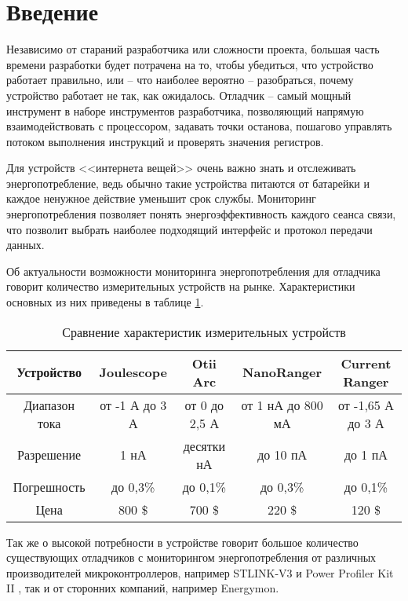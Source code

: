 
\chapter*{Введение}
\hspace{1cm} Независимо от стараний разработчика или сложности проекта, большая часть времени разработки
будет потрачена на то, чтобы убедиться, что устройство работает правильно, или -- что наиболее
вероятно -- разобраться, почему устройство работает не так, как ожидалось. Отладчик -- самый мощный 
инструмент в наборе инструментов разработчика, позволяющий напрямую взаимодействовать с процессором,
задавать точки останова, пошагово управлять потоком выполнения инструкций и проверять  значения
регистров. \cite{Lakamera:embed}

Для устройств <<интернета вещей>> очень важно знать и отслеживать энергопотребление,
ведь обычно такие устройства питаются от батарейки и каждое ненужное действие уменьшит
срок службы. Мониторинг энергопотребления позволяет понять энергоэффективность каждого сеанса связи,
что позволит выбрать наиболее подходящий интерфейс и протокол передачи данных.

Об актуальности возможности мониторинга энергопотребления для отладчика говорит количество 
измерительных устройств на рынке. Характеристики основных из них приведены в таблице 
\ref{comparemeasdevices}.

\begin{table}[H]
    \caption{Сравнение характеристик измерительных устройств}
    \label{comparemeasdevices}   
    \begin{center}
    \begin{tabular}{|c|c|c|c|c|}
    \hline
  Устройство & Joulescope & Otii Arc & NanoRanger & Current Ranger \\ \hline
    Диапазон тока & от -1 А до 3 А & от 0 до 2,5 А & от 1 нА до 800 мА & от -1,65 А до 3 А \\ \hline
    Разрешение & 1 нА & десятки нА & до 10 пА & до 1 пА  \\ \hline
    Погрешность & до 0,3\% & до 0,1\% & до 0,3\% & до 0,1\% \\ \hline
    Цена & 800 \$ & 700 \$ & 220 \$ & 120 \$  \\ \hline
    \end{tabular}
    \end{center}
\end{table} 

Так же о высокой потребности в устройстве говорит большое количество существующих отладчиков с 
мониторингом энергопотребления от различных производителей микроконтроллеров, например STLINK-V3 
\cite{STLINKV3} и Power Profiler Kit II \cite{Power Profiler Kit}, так и от сторонних компаний, например 
Energymon.

